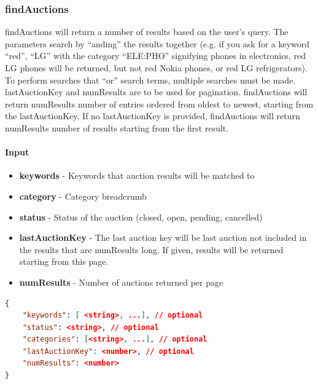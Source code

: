 \documentclass[12pt,a4paper]{article}
\begin{document}
\pagebreak
\subsubsection{findAuctions}

findAuctions will return a number of results based on the user's query. The
parameters search by ``anding'' the results together (e.g. if you ask for a
keyword ``red'', ``LG'' with the category ``ELE:PHO'' signifying phones in
electronics, red LG phones will be returned, but not red Nokia phones, or red
LG refrigerators). To perform searches that ``or'' search terms, multiple
searches must be made. lastAuctionKey and numResults are to be used for
pagination. findAuctions will return numResults number of entries ordered from
oldest to newest, starting from the lastAuctionKey. If no lastAuctionKey is
provided, findAuctions will return numResults number of results starting from
the first result.

\paragraph{Input} 

\begin{itemize}
    \item \textbf{keywords} - Keywords that auction results will be matched to
    \item \textbf{category} - Category breadcrumb
    \item \textbf{status} - Status of the auction (closed, open, pending, cancelled)
    \item \textbf{lastAuctionKey} - The last auction key will be last auction
        not included in the results that are numResults long. If given, results
        will be returned starting from this page.
    \item \textbf{numResults} - Number of auctions returned per page
\end{itemize}

\begin{lstlisting}[language=json,numbers=none]
{
    "keywords": [ <string>, ...], // optional
    "status": <string>, // optional
    "categories": [<string>, ...], // optional
    "lastAuctionKey": <number>, // optional
    "numResults": <number>
}
\end{lstlisting}
\end{document}
